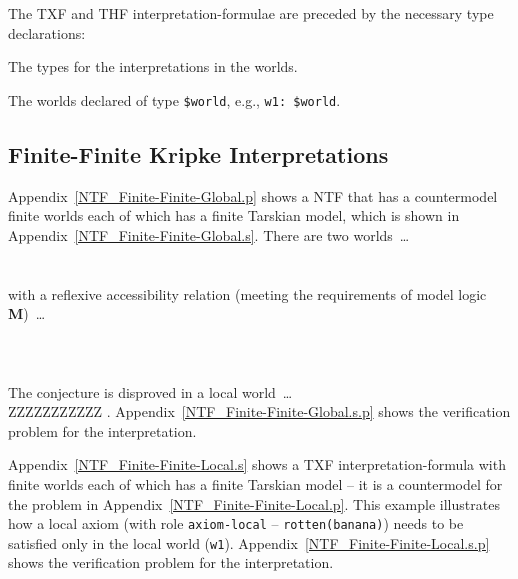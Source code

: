 \documentclass{easychair}
\newenvironment{packed_itemize}{
\vspace*{-0.3em}
\begin{itemize}
\setlength{\partopsep}{0pt}
\setlength{\itemsep}{1pt}
\setlength{\parskip}{0pt}
\setlength{\parsep}{0pt}
}{\end{itemize}}
\begin{document}
\vspace*{0.5em}
The TXF and THF interpretation-formulae are preceded by the necessary type declarations:
\begin{packed_itemize}
\item The types for the interpretations in the worlds.
\item The worlds declared of type {\tt \$world}, e.g., {\tt w1: \$world}.
\end{packed_itemize}

\subsection{Finite-Finite Kripke Interpretations}
\label{NewKripkeFiniteFinite}

Appendix~\ref{NTF_Finite-Finite-Global.p} shows a NTF that has a countermodel finite worlds
each of which has a finite Tarskian model, which is shown in
Appendix~\ref{NTF_Finite-Finite-Global.s}.
There are two worlds~\ldots \\
\hspace*{0.5cm}{\tt ! [W: \$world] : ( W = w1 | W = w2 )} \\
\hspace*{0.5cm}{\tt \$distinct(w1,w2)} \\
with a reflexive accessibility relation (meeting the requirements of model logic {\bf M})~\ldots \\
\hspace*{0.5cm}{\tt \$accessible\_world(w1,w1)} \\
\hspace*{0.5cm}{\tt \$accessible\_world(w2,w2)} \\
\hspace*{0.5cm}{\tt \$accessible\_world(w1,w2)} \\
The conjecture is disproved in a local world~\ldots \\
ZZZZZZZZZZZ
\hspace*{1.0cm}{\tt \$local\_world = w1}.
Appendix~\ref{NTF_Finite-Finite-Global.s.p} shows the verification problem for the interpretation.

Appendix~\ref{NTF_Finite-Finite-Local.s} shows a TXF interpretation-formula with finite worlds
each of which has a finite Tarskian model -- it is a countermodel for the problem in 
Appendix~\ref{NTF_Finite-Finite-Local.p}.
This example illustrates how a local axiom (with role {\tt axiom-local} -- {\tt rotten(banana)})
needs to be satisfied only in the local world ({\tt w1}).
Appendix~\ref{NTF_Finite-Finite-Local.s.p} shows the verification problem for the interpretation.
\end{document}
